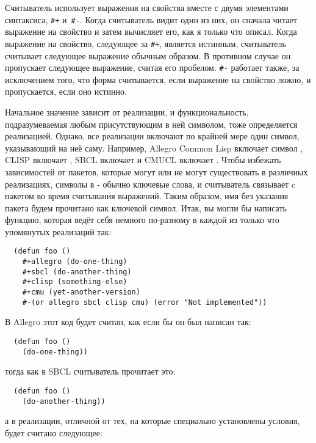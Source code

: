 Считыватель использует выражения на свойства вместе с двумя элементами синтаксиса,
\lstinline!#+! и~\lstinline!#-!. Когда считыватель видит один из них, он сначала читает
выражение на свойство и затем вычисляет его, как я только что описал. Когда выражение на
свойство, следующее за \lstinline!#+!, является истинным, считыватель считывает следующее
выражение обычным образом. В противном случае он пропускает следующее выражение, считая
его пробелом. \lstinline!#-! работает также, за исключением того, что форма считывается,
если выражение на свойство ложно, и пропускается, если оно истинно.

Начальное значение  зависит от реализации, и функциональность,
подразумеваемая любым присутствующим в ней символом, тоже определяется
реализацией. Однако, все реализации включают по крайней мере один символ, указывающий на
неё саму. Например, Allegro Common Lisp включает символ , CLISP включает
, SBCL включает  и CMUCL включает . Чтобы избежать
зависимостей от пакетов, которые могут или не могут существовать в различных реализациях,
символы в  - обычно ключевые слова, и считыватель связывает
 c пакетом  во время считывания выражений. Таким образом,
имя без указания пакета будем прочитано как ключевой символ. Итак, вы могли бы написать
функцию, которая ведёт себя немного по-разному в каждой из только что упомянутых
реализаций так:

\begin{lstlisting}
  (defun foo ()
    #+allegro (do-one-thing)
    #+sbcl (do-another-thing)
    #+clisp (something-else)
    #+cmu (yet-another-version)
    #-(or allegro sbcl clisp cmu) (error "Not implemented"))
\end{lstlisting}

В Allegro этот код будет считан, как если бы он был написан так:

\begin{lstlisting}
  (defun foo ()
    (do-one-thing))
\end{lstlisting}

тогда как в SBCL считыватель прочитает это:

\begin{lstlisting}
  (defun foo ()
    (do-another-thing))
\end{lstlisting}

а в реализации, отличной от тех, на которые специально установлены условия, будет считано
следующее:

